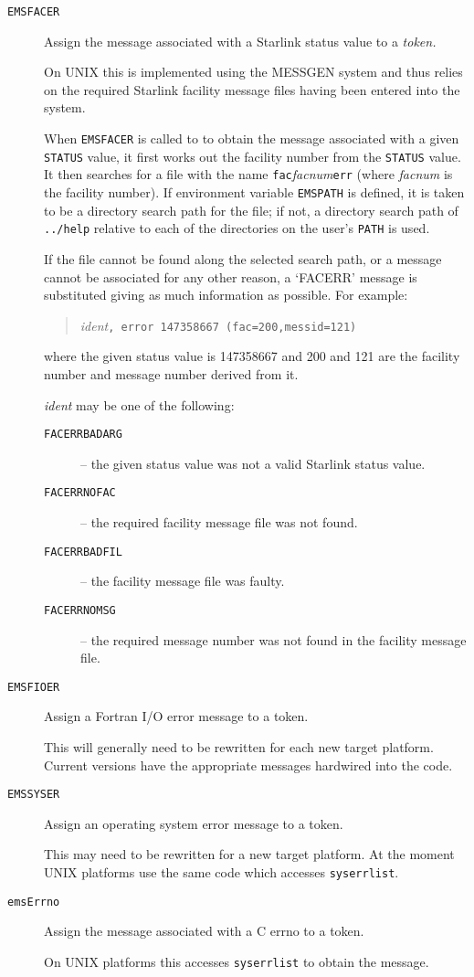 \documentclass[twoside,11pt]{article}
\newcommand{\htmlref}[2]{#1}
\newcommand{\xref}[3]{#1}
\renewcommand{\_}{\texttt{\symbol{95}}}
\begin{document}
\begin {description}
\item [\htmlref{\texttt{EMS\_FACER}}{EMS_FACER}]  Assign the message
associated with a Starlink status value to a \textit{token.}

On UNIX this is implemented using the \xref{MESSGEN}{sun185}{} system
and thus relies on the required Starlink facility message files
having been entered into the system.

When \texttt{EMS\_FACER} is called to to obtain the message associated with a
given \texttt{STATUS} value, it first works out the facility number from the
\texttt{STATUS} value.
It then searches for a file with the name
\texttt{fac\_}\textit{facnum}\texttt{\_err} (where \textit{facnum} is the
facility number).
If environment variable \texttt{EMS\_PATH} is defined, it is taken to be a
directory search path for the file; 
if not, a directory search path of \texttt{../help} relative to each of the
directories on the user's \texttt{PATH} is used.

If the file cannot be found along the selected search path, or
a message cannot be associated for any other reason, a `FACERR' message is 
substituted giving as much information as possible. 
For example:
\begin{quote}
\textit{ident}\texttt{, error 147358667 (fac=200,messid=121)}
\end{quote}
where the given status value is 147358667 and 200 and 121 are the facility
number and message number derived from it.

\textit{ident} may be one of the following:
\begin{description}
\item[\texttt{FACERR\_\_BADARG}] --
the given status value was not a valid Starlink status value.
\item[\texttt{FACERR\_\_NOFAC}] --
the required facility message file was not found.
\item[\texttt{FACERR\_\_BADFIL}] -- 
the facility message file was faulty.
\item[\texttt{FACERR\_\_NOMSG}] -- 
the required message number was not found in the facility message file.
\end{description}
\item [\htmlref{\texttt{EMS\_FIOER}}{EMS_FIOER}]
Assign a Fortran I/O error message to a token.

This will generally need to be rewritten for each new target platform.
Current versions have the appropriate messages hardwired into the code.
\item [\htmlref{\texttt{EMS\_SYSER}}{EMS_SYSER}]  Assign an operating system
error message to a token.

This may need to be rewritten for a new target platform. At the
moment UNIX platforms use the same code which accesses \texttt{sys\_errlist}.
\item [\texttt{emsErrno}] Assign the message associated with a C errno to a
token.

On UNIX platforms this accesses \texttt{sys\_errlist} to obtain the message.
\end{description}
\end{document}
